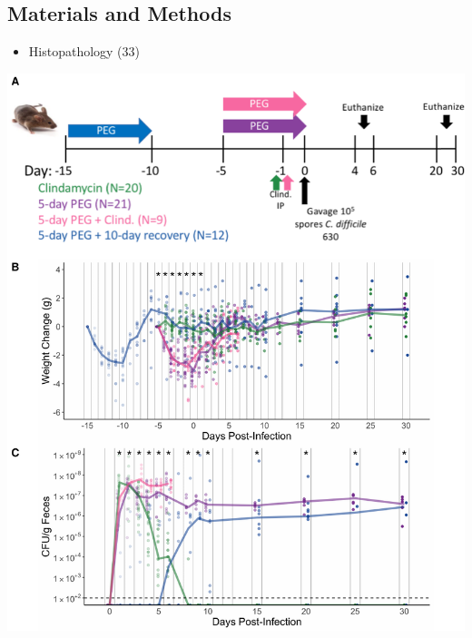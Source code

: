 \documentclass[
  11pt,
]{article}
\providecommand{\tightlist}{%
  \setlength{\itemsep}{0pt}\setlength{\parskip}{0pt}}
\begin{document}
\hypertarget{materials-and-methods}{%
\subsection{Materials and Methods}\label{materials-and-methods}}

\begin{itemize}
\tightlist
\item
  Histopathology (33)
\end{itemize}

\newpage

\includegraphics{figure_1.pdf}
\end{document}
